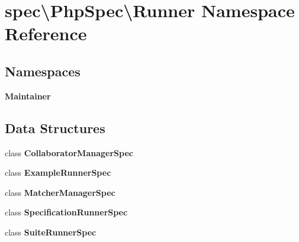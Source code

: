 \section{spec\textbackslash{}Php\+Spec\textbackslash{}Runner Namespace Reference}
\label{namespacespec_1_1_php_spec_1_1_runner}
\subsection*{Namespaces}
\begin{DoxyCompactItemize}
\item 
 {\bf Maintainer}
\end{DoxyCompactItemize}
\subsection*{Data Structures}
\begin{DoxyCompactItemize}
\item 
class {\bf Collaborator\+Manager\+Spec}
\item 
class {\bf Example\+Runner\+Spec}
\item 
class {\bf Matcher\+Manager\+Spec}
\item 
class {\bf Specification\+Runner\+Spec}
\item 
class {\bf Suite\+Runner\+Spec}
\end{DoxyCompactItemize}
